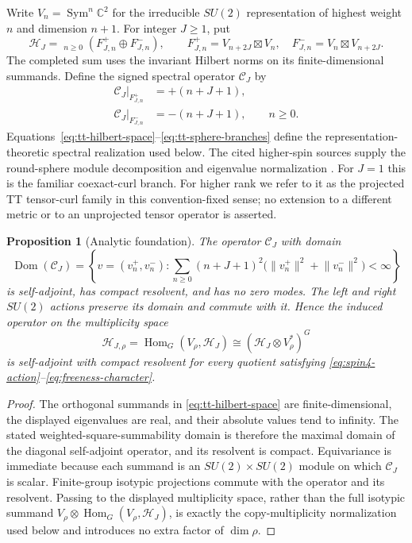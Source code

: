\documentclass[11pt]{article}
\newtheorem{proposition}[theorem]{Proposition}
\theoremstyle{definition}
\DeclareMathOperator{\Sym}{Sym}
\DeclareMathOperator{\Hom}{Hom}
\newcommand{\C}{\mathbb C}
\begin{document}
Write $V_n=\Sym^n\C^2$ for the irreducible $SU(2)$ representation of
highest weight $n$ and dimension $n+1$.  For integer $J\geq1$, put
\begin{equation}
 \mathcal H_J=\mathop{\widehat{\bigoplus}}_{n\geq0}
 \left(F^+_{J,n}\oplus F^-_{J,n}\right),
 \qquad
 F^+_{J,n}=V_{n+2J}\boxtimes V_n,
 \quad
 F^-_{J,n}=V_n\boxtimes V_{n+2J}.
 \label{eq:tt-hilbert-space}
\end{equation}
The completed sum uses the invariant Hilbert norms on its finite-dimensional
summands.  Define the signed spectral operator $\mathcal C_J$ by
\begin{align}
 \mathcal C_J|_{F^+_{J,n}}&=+(n+J+1),\nonumber\\
 \mathcal C_J|_{F^-_{J,n}}&=-(n+J+1),
 \qquad n\geq0.
 \label{eq:tt-sphere-branches}
\end{align}
Equations~\eqref{eq:tt-hilbert-space}--\eqref{eq:tt-sphere-branches} define the
representation-theoretic spectral realization used below.  The cited
higher-spin sources supply the round-sphere module decomposition and
eigenvalue normalization \cite{Homma2001,HommaTomihisa2021}.  For $J=1$ this
is the familiar coexact-curl branch.  For higher rank we refer to it as the
projected TT tensor-curl family in this convention-fixed sense; no extension
to a different metric or to an unprojected tensor operator is asserted.

\begin{proposition}[Analytic foundation]
\label{prop:analytic-foundation}
The operator $\mathcal C_J$ with domain
\[
 \operatorname{Dom}(\mathcal C_J)=
 \left\{v=(v_n^+,v_n^-):
 \sum_{n\geq0}(n+J+1)^2
 \bigl(\lVert v_n^+\rVert^2+\lVert v_n^-\rVert^2\bigr)<\infty\right\}
\]
is self-adjoint, has compact resolvent, and has no zero modes.  The left and
right $SU(2)$ actions preserve its domain and commute with it.  Hence the
induced operator on the multiplicity space
\begin{equation}
 \mathcal H_{J,\rho}
 =\Hom_G(V_\rho,\mathcal H_J)
 \cong(\mathcal H_J\otimes V_\rho^*)^G
 \label{eq:twisted-multiplicity-space}
\end{equation}
is self-adjoint with compact resolvent for every quotient satisfying
\eqref{eq:spin4-action}--\eqref{eq:freeness-character}.
\end{proposition}

\begin{proof}
The orthogonal summands in \eqref{eq:tt-hilbert-space} are finite-dimensional,
the displayed eigenvalues are real, and their absolute values tend to infinity.
The stated weighted-square-summability domain is therefore the maximal domain
of the diagonal self-adjoint operator, and its resolvent is compact.  Equivariance
is immediate because each summand is an $SU(2)\times SU(2)$ module on which
$\mathcal C_J$ is scalar.  Finite-group isotypic projections commute with the
operator and its resolvent.  Passing to the displayed multiplicity space,
rather than the full isotypic summand
$V_\rho\otimes\Hom_G(V_\rho,\mathcal H_J)$, is exactly the
copy-multiplicity normalization used below and introduces no extra factor of
$\dim\rho$.
\end{proof}
\end{document}
